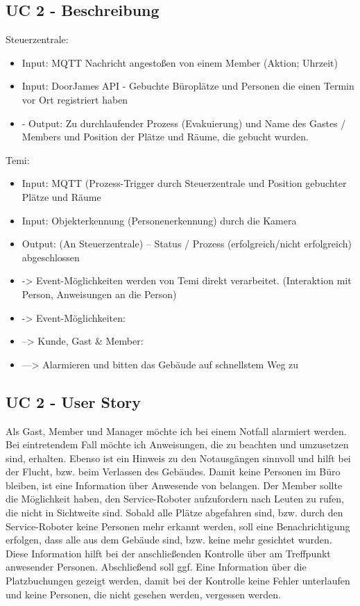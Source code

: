\subsection*{UC 2 - Beschreibung}
    Steuerzentrale:
    \begin{itemize}
        \item Input: MQTT Nachricht angestoßen von einem Member (Aktion; Uhrzeit)
        \item Input: DoorJames API - Gebuchte Büroplätze und Personen die einen Termin vor Ort registriert haben
        \item -	Output: Zu durchlaufender Prozess (Evakuierung) und Name des Gastes / Members und Position der Plätze und Räume, die gebucht wurden. 
    \end{itemize}
	
    Temi: 
    \begin{itemize}
        \item Input: MQTT (Prozess-Trigger durch Steuerzentrale und Position gebuchter Plätze und Räume
        \item Input: Objekterkennung (Personenerkennung) durch die Kamera
        \item Output: (An Steuerzentrale) – Status / Prozess (erfolgreich/nicht erfolgreich) abgeschlossen
        \item -> Event-Möglichkeiten werden von Temi direkt verarbeitet. (Interaktion mit Person, Anweisungen an die Person) 
        \item -> Event-Möglichkeiten: 
        \item --> Kunde, Gast & Member: 
        \item ---> Alarmieren und bitten das Gebäude auf schnellstem Weg zu
    \end{itemize}

\subsection*{UC 2 - User Story}
    Als Gast, Member und Manager möchte ich bei einem Notfall alarmiert werden. Bei eintretendem Fall möchte ich 
    Anweisungen, die zu beachten und umzusetzen sind, erhalten. Ebenso ist ein Hinweis zu den Notausgängen sinnvoll 
    und hilft bei der Flucht, bzw. beim Verlassen des Gebäudes. Damit keine Personen im Büro bleiben, ist eine 
    Information über Anwesende von belangen. Der Member sollte die Möglichkeit haben, den Service-Roboter 
    aufzufordern nach Leuten zu rufen, die nicht in Sichtweite sind. Sobald alle Plätze abgefahren sind, bzw. 
    durch den Service-Roboter keine Personen mehr erkannt werden, soll eine Benachrichtigung erfolgen, dass alle 
    aus dem Gebäude sind, bzw. keine mehr gesichtet wurden. Diese Information hilft bei der anschließenden Kontrolle 
    über am Treffpunkt anwesender Personen. Abschließend soll ggf. Eine Information über die Platzbuchungen gezeigt 
    werden, damit bei der Kontrolle keine Fehler unterlaufen und keine Personen, die nicht gesehen werden, vergessen 
    werden. 
